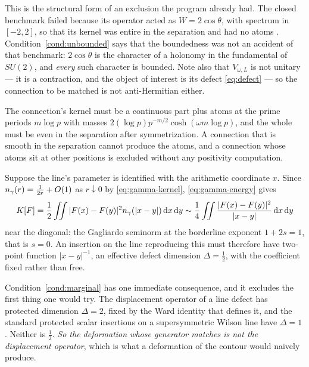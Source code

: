 This is the structural form of an exclusion the program already had. The closed
benchmark failed because its operator acted as $W=2\cos\theta$, with spectrum in
$[-2,2]$, so that its kernel was entire in the separation and had no atoms
\cite{Selection}. Condition~\ref{cond:unbounded} says that the boundedness was
not an accident of that benchmark: $2\cos\theta$ is the character of a holonomy
in the fundamental of $SU(2)$, and \emph{every} such character is bounded. Note
also that $V_{\omega,L}$ is not unitary --- it is a contraction, and the object
of interest is its defect \eqref{eq:defect} --- so the connection to be matched is
not anti-Hermitian either.

\begin{condition}\label{cond:atoms}
The connection's kernel must be a continuous part plus atoms at the prime periods
$m\log p$ with masses $2(\log p)p^{-m/2}\cosh(\omega m\log p)$, and the whole must
be even in the separation after symmetrization. A connection that is smooth in
the separation cannot produce the atoms, and a connection whose atoms sit at
other positions is excluded without any positivity computation.
\end{condition}

\begin{condition}\label{cond:marginal}
Suppose the line's parameter is identified with the arithmetic coordinate $x$.
Since $n_{\gamma}(r)=\frac1{2r}+O(1)$ as $r\downarrow0$ by
\eqref{eq:gamma-kernel}, \eqref{eq:gamma-energy} gives
\[
 K[F]=\frac12\iint|F(x)-F(y)|^2n_{\gamma}(|x-y|)\,\mathrm d x\,\mathrm d y
 \sim\frac14\iint\frac{|F(x)-F(y)|^2}{|x-y|}\,\mathrm d x\,\mathrm d y
\]
near the diagonal: the Gagliardo seminorm at the borderline exponent
$1+2s=1$, that is $s=0$. An insertion on the line reproducing this must therefore
have two-point function $|x-y|^{-1}$, an effective defect dimension
$\Delta=\frac12$, with the coefficient fixed rather than free.
\end{condition}

Condition~\ref{cond:marginal} has one immediate consequence, and it excludes the
first thing one would try. The displacement operator of a line defect has
protected dimension $\Delta=2$, fixed by the Ward identity that defines it, and
the standard protected scalar insertions on a supersymmetric Wilson line have
$\Delta=1$ \cite{GiombiKomatsu,CHMS}. Neither is $\frac12$. \emph{So the
deformation whose generator matches is not the displacement operator}, which is
what a deformation of the contour would naively produce.


